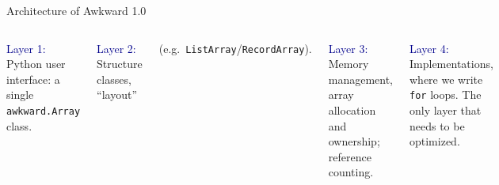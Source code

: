 \documentclass[aspectratio=169]{beamer}
\begin{document}
\begin{frame}{Architecture of Awkward 1.0}
\large
\vspace{0.5 cm}
\begin{columns}
\vspace{-0.2 cm}

\textcolor{darkblue}{Layer 1:} Python user interface: a single \texttt{awkward.Array} class.
\vspace{\baselineskip}

\vspace{0.18 cm}
\textcolor{darkblue}{Layer 2:} Structure classes, ``layout''

(e.g.\ \texttt{ListArray}/\texttt{RecordArray}).
\vspace{\baselineskip}

\vspace{0.18 cm}
\textcolor{darkblue}{Layer 3:} Memory management, array allocation and ownership; reference counting.
\vspace{\baselineskip}

\vspace{0.18 cm}
\textcolor{darkblue}{Layer 4:} Implementations, where we write \texttt{for} loops. The only layer that needs to be optimized.

\includegraphics[width=\linewidth]{awkward-1-0-layers.pdf}
\end{columns}
\end{frame}
\end{document}

